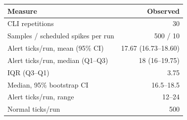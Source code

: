 \begin{tabular}{@{}lr@{}}
\toprule
\textbf{Measure} & \textbf{Observed} \\
\midrule
CLI repetitions & 30 \\
Samples / scheduled spikes per run & 500 / 10 \\
Alert ticks/run, mean (95\% CI) & 17.67 (16.73--18.60) \\
Alert ticks/run, median (Q1--Q3) & 18 (16--19.75) \\
IQR (Q3--Q1) & 3.75 \\
Median, 95\% bootstrap CI & 16.5--18.5 \\
Alert ticks/run, range & 12--24 \\
Normal ticks/run & 500 \\
\bottomrule
\end{tabular}
